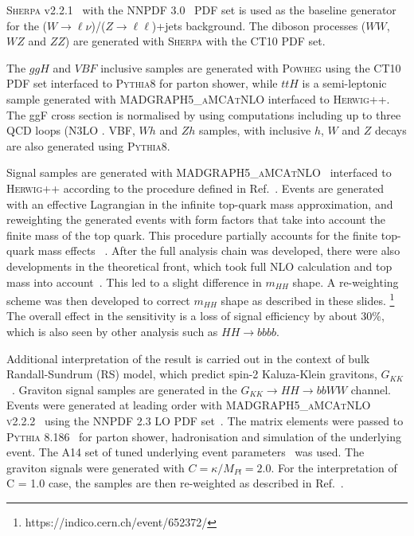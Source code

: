 \textsc{Sherpa} v2.2.1~\cite{Gleisberg:2008ta} with the
\textsc{NNPDF 3.0}~\cite{Lai:2010vv} PDF set is used as the baseline
generator for the ($W \to \ell\nu$)/($Z\to \ell\ell$)+jets background.
The diboson processes ($WW$,
$WZ$ and $ZZ$) are generated with \textsc{Sherpa} with the \textsc{CT10} PDF
set.  

The $ggH$ and $VBF$ inclusive samples are generated with \textsc{Powheg} using
the \textsc{CT10} PDF set interfaced to \textsc{Pythia8} for parton
shower, while $ttH$ is a semi-leptonic sample generated with
\textsc{MADGRAPH5\_aMCAtNLO} interfaced to \textsc{Herwig++}. The ggF cross
section is normalised by using computations including up to three QCD
loops (N3LO \cite{Anastasiou:2016cez}. VBF, $Wh$ and $Zh$ samples,
  with inclusive $h$, $W$ and $Z$ decays
are also generated using \textsc{Pythia8}. 


Signal samples are
generated with \textsc{MADGRAPH5\_aMCAtNLO}~\cite{Alwall:2014hca} interfaced to
\textsc{Herwig++} according to the procedure defined in Ref.~\cite{CP3Paper}. 
Events are generated with an effective
Lagrangian in the infinite top-quark mass approximation, and  reweighting the
generated events  with form factors that take into
account the finite mass of the top quark.  This procedure partially
accounts for the finite top-quark mass effects ~\cite{Degrassi_Ramona}. After the full analysis chain was developed, there were also developments in the theoretical front, which took full NLO calculation and top mass into account~\cite{Borowka:2016ypz, Borowka:2016ehy}. This led to a slight difference in $m_{HH}$ shape. A re-weighting scheme was then developed to correct $m_{HH}$ shape as described in these slides. {\footnote {https://indico.cern.ch/event/652372/}} The overall effect in the sensitivity is a loss of signal efficiency by about 30\%, which is also seen by other analysis such as $HH \rightarrow bbbb$. 

Additional interpretation of the result is carried out in the context of bulk Randall-Sundrum (RS) model, which predict spin-2 Kaluza-Klein gravitons, $G_{KK}$~\cite{Agashe:2007zd, Fitzpatrick:2007qr}. Graviton signal samples are generated in the $G_{KK}\rightarrow HH \rightarrow bbWW$ channel. Events were generated at leading order with \textsc{MADGRAPH5\_aMCAtNLO v2.2.2}~\cite{Alwall:2014hca} using the \textsc{NNPDF 2.3} LO PDF set~\cite{Ball:2012cx}. The matrix elements were passed to  \textsc{Pythia 8.186}~\cite{Sjostrand:2007gs} for parton
shower, hadronisation and simulation of the underlying event. The A14 set of tuned underlying event parameters~\cite{ATL-PHYS-PUB-2014-021} was used. The graviton signals were generated with $C = \kappa / M_{Pl} = 2.0$. For the interpretation of C = 1.0 case, the samples are then re-weighted as described in Ref.~\cite{Borowka:2016ypz, Borowka:2016ehy}.
 
